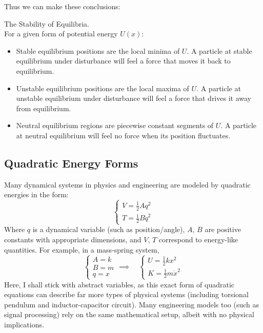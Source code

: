 \documentclass[11pt]{article}
\theoremstyle{gangnamstyle}{\newtheorem{definition}{Definition}[]}
\theoremstyle{gangnamstyle}{\newtheorem{example}{Example}[]}
\theoremstyle{gangnamstyle}{\newtheorem{problem}{Problem}[]}
\theoremstyle{gangnamstyle}{\newtheorem{warning}{Warning}[]}
\begin{document}
Thus we can make these conclusions: 

\begin{definition}
The Stability of Equilibria. \\
For a given form of potential energy $U(x)$:
\begin{itemize}
\item Stable equilibrium positions are the local minima of $U$. A particle at stable equilibrium under disturbance will feel a force that moves it back to equilibrium.
\item Unstable equilibrium positions are the local maxima of $U$. A particle at unstable equilibrium under disturbance will feel a force that drives it away from equilibrium. 
\item Neutral equilibrium regions are piecewise constant segments of $U$. A particle at neutral equilibrium will feel no force when its position fluctuates. 
\end{itemize}

\end{definition}

\subsection{Quadratic Energy Forms}

Many dynamical systems in physics and engineering are modeled by quadratic energies in the form: 
\[ \begin{cases}
V = \frac{1}{2} Aq^2 \\
T = \frac{1}{2} B\Dot{q}^2
\end{cases} \]
Where $q$ is a dynamical variable (such as position/angle), $A$, $B$ are positive constants with appropriate dimensions, and $V$, $T$ correspond to energy-like quantities. For example, in a mass-spring system, 
\[ \begin{cases}
A = k \\
B = m \\
q = x
\end{cases} \implies \quad \begin{cases}
U = \frac{1}{2} kx^2 \\
K = \frac{1}{2} m\Dot{x}^2
\end{cases} \]
Here, I shall stick with abstract variables, as this exact form of quadratic equations can describe far more types of physical systems (including torsional pendulum and inductor-capacitor circuit). Many engineering models too (such as signal processing) rely on the same mathematical setup, albeit with no physical implications. \\
\end{document}
